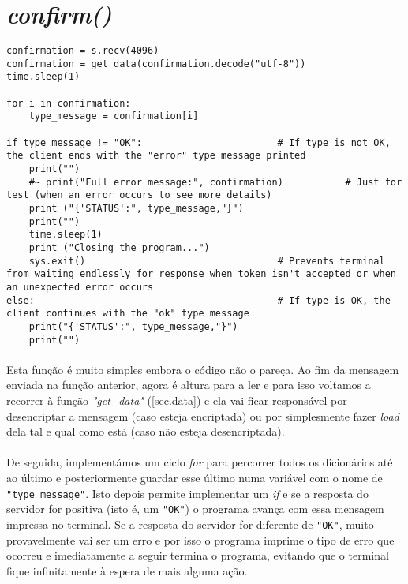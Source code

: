 \documentclass[a4paper]{report}
\begin{document}
\newpage

\section{\textit{confirm()}}
\begin{lstlisting}
confirmation = s.recv(4096)
confirmation = get_data(confirmation.decode("utf-8"))
time.sleep(1)

for i in confirmation:
	type_message = confirmation[i]
	
if type_message != "OK":						# If type is not OK, the client ends with the "error" type message printed
	print("")
	#~ print("Full error message:", confirmation)			# Just for test (when an error occurs to see more details)
	print ("{'STATUS':", type_message,"}")
	print("")
	time.sleep(1)
	print ("Closing the program...")
	sys.exit()									# Prevents terminal from waiting endlessly for response when token isn't accepted or when an unexpected error occurs
else:											# If type is OK, the client continues with the "ok" type message
	print("{'STATUS':", type_message,"}")
	print("")
\end{lstlisting}
\paragraph{}Esta função é muito simples embora o código não o pareça. Ao fim da mensagem enviada na função anterior, agora é altura para a ler e para isso voltamos a recorrer à função \textit{"get\_data"} (\autoref{sec.data}) e ela vai ficar responsável por desencriptar a mensagem (caso esteja encriptada) ou por simplesmente fazer \textit{load} dela tal e qual como está (caso não esteja desencriptada).

\paragraph{}De seguida, implementámos um ciclo \textit{for} para percorrer todos os dicionários até ao último e posteriormente guardar esse último numa variável com o nome de \texttt{"type\_message"}. Isto depois permite implementar um \textit{if} e se a resposta do servidor for positiva (isto é, um \texttt{"OK"}) o programa avança com essa mensagem impressa no terminal. Se a resposta do servidor for diferente de \texttt{"OK"}, muito provavelmente vai ser um erro e por isso o programa imprime o tipo de erro que ocorreu e imediatamente a seguir termina o programa, evitando que o terminal fique infinitamente à espera de mais alguma ação.
\end{document}
